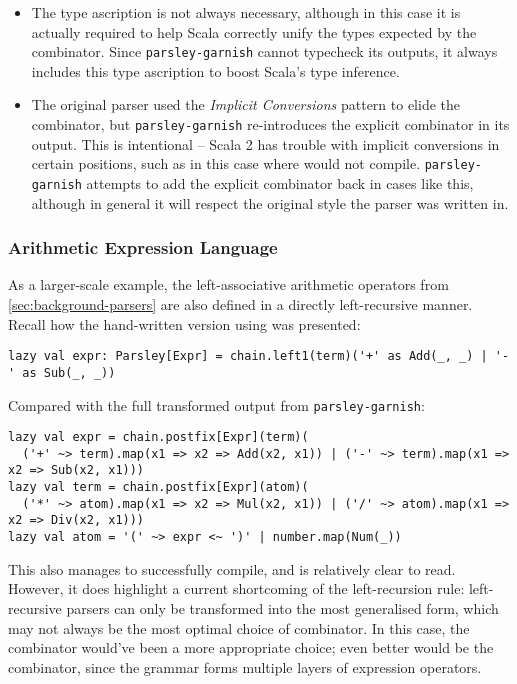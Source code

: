 \documentclass[../../main.tex]{subfiles}
\begin{document}
\begin{itemize}
  \item The type ascription  is not always necessary, although in this case it is actually required to help Scala correctly unify the types expected by the combinator. Since \texttt{parsley-garnish} cannot typecheck its outputs, it always includes this type ascription to boost Scala's type inference.
  \item The original parser used the \emph{Implicit Conversions} pattern to elide the  combinator, but \texttt{parsley-garnish} re-introduces the explicit  combinator in its output. This is intentional -- Scala 2 has trouble with implicit conversions in certain positions, such as in this case where  would not compile. \texttt{parsley-garnish} attempts to add the explicit combinator back in cases like this, although in general it will respect the original style the parser was written in.
\end{itemize}

\subsubsection{Arithmetic Expression Language}
As a larger-scale example, the left-associative arithmetic operators from \cref{sec:background-parsers} are also defined in a directly left-recursive manner.
Recall how the hand-written version using  was presented:
\begin{verbatim}
lazy val expr: Parsley[Expr] = chain.left1(term)('+' as Add(_, _) | '-' as Sub(_, _))
\end{verbatim}
%
Compared with the full transformed output from \texttt{parsley-garnish}:
\begin{verbatim}
lazy val expr = chain.postfix[Expr](term)(
  ('+' ~> term).map(x1 => x2 => Add(x2, x1)) | ('-' ~> term).map(x1 => x2 => Sub(x2, x1)))
lazy val term = chain.postfix[Expr](atom)(
  ('*' ~> atom).map(x1 => x2 => Mul(x2, x1)) | ('/' ~> atom).map(x1 => x2 => Div(x2, x1)))
lazy val atom = '(' ~> expr <~ ')' | number.map(Num(_))
\end{verbatim}
%
This also manages to successfully compile, and is relatively clear to read.
However, it does highlight a current shortcoming of the left-recursion rule: left-recursive parsers can only be transformed into the most generalised  form, which may not always be the most optimal choice of combinator.
In this case, the  combinator would've been a more appropriate choice; even better would be the  combinator, since the grammar forms multiple layers of expression operators.
\end{document}
